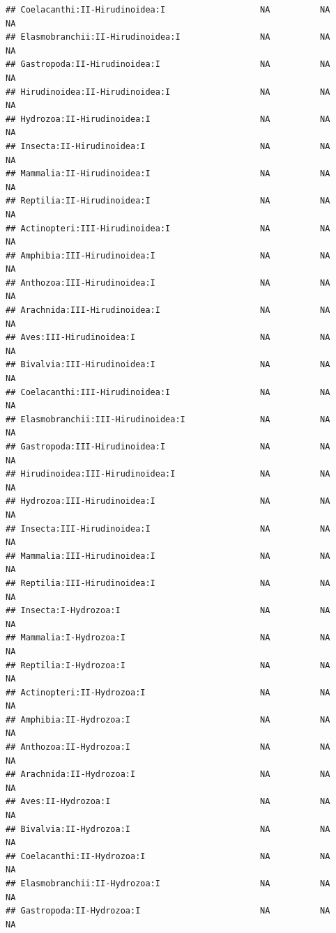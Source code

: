 \documentclass[
  12pt,
]{article}
\begin{document}
\begin{verbatim}
## Coelacanthi:II-Hirudinoidea:I                   NA          NA          NA
## Elasmobranchii:II-Hirudinoidea:I                NA          NA          NA
## Gastropoda:II-Hirudinoidea:I                    NA          NA          NA
## Hirudinoidea:II-Hirudinoidea:I                  NA          NA          NA
## Hydrozoa:II-Hirudinoidea:I                      NA          NA          NA
## Insecta:II-Hirudinoidea:I                       NA          NA          NA
## Mammalia:II-Hirudinoidea:I                      NA          NA          NA
## Reptilia:II-Hirudinoidea:I                      NA          NA          NA
## Actinopteri:III-Hirudinoidea:I                  NA          NA          NA
## Amphibia:III-Hirudinoidea:I                     NA          NA          NA
## Anthozoa:III-Hirudinoidea:I                     NA          NA          NA
## Arachnida:III-Hirudinoidea:I                    NA          NA          NA
## Aves:III-Hirudinoidea:I                         NA          NA          NA
## Bivalvia:III-Hirudinoidea:I                     NA          NA          NA
## Coelacanthi:III-Hirudinoidea:I                  NA          NA          NA
## Elasmobranchii:III-Hirudinoidea:I               NA          NA          NA
## Gastropoda:III-Hirudinoidea:I                   NA          NA          NA
## Hirudinoidea:III-Hirudinoidea:I                 NA          NA          NA
## Hydrozoa:III-Hirudinoidea:I                     NA          NA          NA
## Insecta:III-Hirudinoidea:I                      NA          NA          NA
## Mammalia:III-Hirudinoidea:I                     NA          NA          NA
## Reptilia:III-Hirudinoidea:I                     NA          NA          NA
## Insecta:I-Hydrozoa:I                            NA          NA          NA
## Mammalia:I-Hydrozoa:I                           NA          NA          NA
## Reptilia:I-Hydrozoa:I                           NA          NA          NA
## Actinopteri:II-Hydrozoa:I                       NA          NA          NA
## Amphibia:II-Hydrozoa:I                          NA          NA          NA
## Anthozoa:II-Hydrozoa:I                          NA          NA          NA
## Arachnida:II-Hydrozoa:I                         NA          NA          NA
## Aves:II-Hydrozoa:I                              NA          NA          NA
## Bivalvia:II-Hydrozoa:I                          NA          NA          NA
## Coelacanthi:II-Hydrozoa:I                       NA          NA          NA
## Elasmobranchii:II-Hydrozoa:I                    NA          NA          NA
## Gastropoda:II-Hydrozoa:I                        NA          NA          NA

\end{verbatim}
\end{document}
